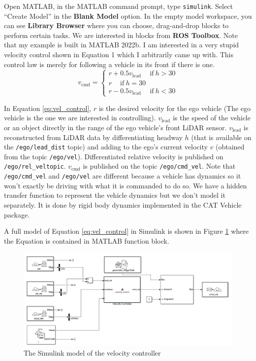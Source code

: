 \documentclass[
]{article}
\begin{document}
Open MATLAB, in the MATLAB command prompt, type \texttt{simulink}.
Select ``Create Model'' in the \textbf{Blank Model} option. In the empty
model workspace, you can see \textbf{Library Browser} where you can
choose, drag-and-drop blocks to perform certain tasks. We are interested
in blocks from \textbf{ROS Toolbox}. Note that my example is built in
MATLAB 2022b. I am interested in a very stupid velocity control shown in
Equation 1 which I arbitrarily came up with. This control law is merely
for following a vehicle in its front if there is one. \begin{equation}
\label{eq:vel_control}
v_{\textrm{cmd}} = \begin{cases}r + 0.5 v_{\textrm{lead}}\quad ~\textrm{if}~ h > 30 \\
r \quad ~\textrm{if}~ h = 30\\
r - 0.5 v_{\textrm{lead}}\quad ~\textrm{if}~ h < 30
\end{cases}
\end{equation}

In Equation \eqref{eq:vel_control}, \(r\) is the desired velocity for
the ego vehicle (The ego vehicle is the one we are interested in
controlling). \(v_{\textrm{lead}}\) is the speed of the vehicle or an
object directly in the range of the ego vehicle's front LiDAR sensor.
\(v_{\textrm{lead}}\) is reconstructed from LiDAR data by
differentiating headway \(h\) (that is available on the
\texttt{/ego/lead\_dist} topic) and adding to the ego's current velocity
\(v\) (obtained from the topic \texttt{/ego/vel}). Differentiated
relative velocity is published on \texttt{/ego/rel\_veltopic}.
\(v_{\textrm{cmd}}\) is published on the topic \texttt{/ego/cmd\_vel}.
Note that \texttt{/ego/cmd\_vel} and \texttt{/ego/vel} are different
because a vehicle has dynamics so it won't exactly be driving with what
it is commanded to do so. We have a hidden transfer function to
represent the vehicle dynamics but we don't model it separately. It is
done by rigid body dynamics implemented in the CAT Vehicle package.

A full model of Equation \eqref{eq:vel_control} in Simulink is shown in
Figure \ref{fig:simulink_model.png} where the Equation is contained in
MATLAB function block.

\begin{figure}[htbp]
\centering
\includegraphics[width=1.0\textwidth]{simulink_model.png}
\caption{The Simulink model of the velocity controller}
\label{fig:simulink_model.png}
\end{figure}
\end{document}
